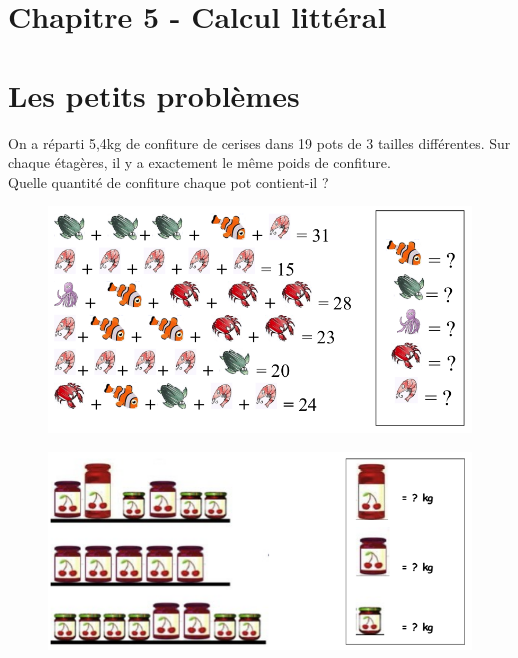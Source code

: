 



\setlength{\columnseprule}{0pt}

\horrule{2px}
\section*{Chapitre 5 - Calcul littéral}
\horrule{2px}

\section*{Les petits problèmes}

\begin{multicols}{2}

  On a réparti 5,4kg de confiture de cerises dans 19 pots de 3 tailles différentes. Sur chaque étagères, il  y a exactement le même poids de confiture. \\
  Quelle quantité de confiture chaque pot contient-il ?
  
  \begin{figure}[H]
    \centering
    \includegraphics[width=0.8\linewidth]{4x5-calcul-litteral/poissons-1.png}
  \end{figure}

  \begin{figure}[H]
    \centering
    \includegraphics[width=0.8\linewidth]{4x5-calcul-litteral/confitures.png}
  \end{figure}


\end{multicols}
